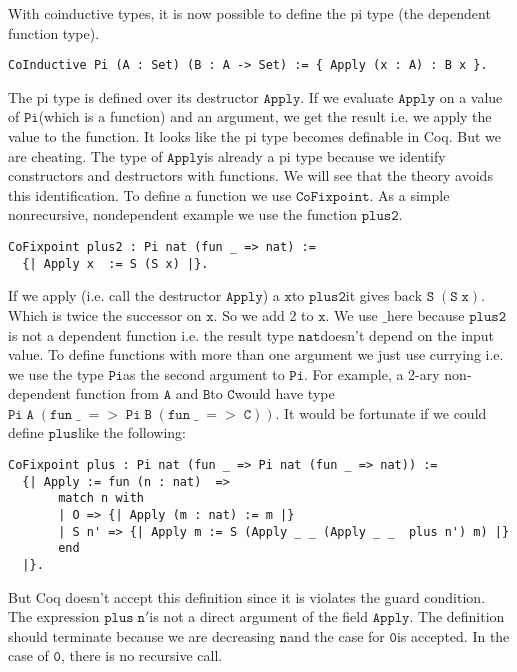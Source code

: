 \documentclass[a4paper,cleardoubleempty,BCOR1cm]{scrbook}
\begin{document}
With coinductive types, it is now possible to define the pi type (the dependent
function type).

\begin{verbatim}
CoInductive Pi (A : Set) (B : A -> Set) := { Apply (x : A) : B x }.
\end{verbatim}

The pi type is defined over its destructor $\mathtt{Apply}$.  If we evaluate $\mathtt{Apply}$
on a value of $\mathtt{Pi}$\;(which is a function) and an argument, we get the result
i.e. we apply the value to the function.  It looks like the pi type becomes definable
in Coq.  But we are cheating.  The type of $\mathtt{Apply}$\;is already a pi type because
we identify constructors and destructors with functions.  We will see that
the theory \cite{basold2016type} 
avoids this identification. To define a function we use
$\mathtt{CoFixpoint}$.  As a simple nonrecursive, nondependent example we use the
function $\mathtt{plus2}$.

\begin{verbatim}
CoFixpoint plus2 : Pi nat (fun _ => nat) :=
  {| Apply x  := S (S x) |}.
\end{verbatim}

If we apply (i.e. call the destructor $\mathtt{Apply}$) a $\mathtt{x}$\;to $\mathtt{plus2}$\;it gives back
$\mathtt{S\;(S\;x)}$.  Which is twice the successor on $\mathtt{x}$.  So we add 2 to $\mathtt{x}$.  We
use $\mathtt{\_}$\;here because $\mathtt{plus2}$\;is not a dependent function i.e. the result
type $\mathtt{nat}$\;doesn't depend on the input value.  To define functions with more
than one argument we just use currying i.e. we use the type $\mathtt{Pi}$\;as the
second argument to $\mathtt{Pi}$. For example, a 2-ary non-dependent function from $\mathtt{A}$
and $\mathtt{B}$\;to $\mathtt{C}$\;would have type $\mathtt{Pi\;A\;(fun\;\_\;=>\;Pi\;B\;(fun\;\_\;=>\;C))}$.  It
would be fortunate if we could define $\mathtt{plus}$\;like the following:

\begin{verbatim}
CoFixpoint plus : Pi nat (fun _ => Pi nat (fun _ => nat)) :=
  {| Apply := fun (n : nat)  =>
       match n with
       | O => {| Apply (m : nat) := m |}
       | S n' => {| Apply m := S (Apply _ _ (Apply _ _  plus n') m) |}
       end
  |}.
\end{verbatim}

But Coq doesn't accept this definition since it is violates the guard condition. The
expression $\mathtt{plus\;n'}$\;is not a direct argument of the field $\mathtt{Apply}$. The
definition should terminate because we are decreasing $\mathtt{n}$\;and the case for
$\mathtt{0}$\;is accepted. In the case of $\mathtt{0}$, there is no recursive call.
\end{document}
